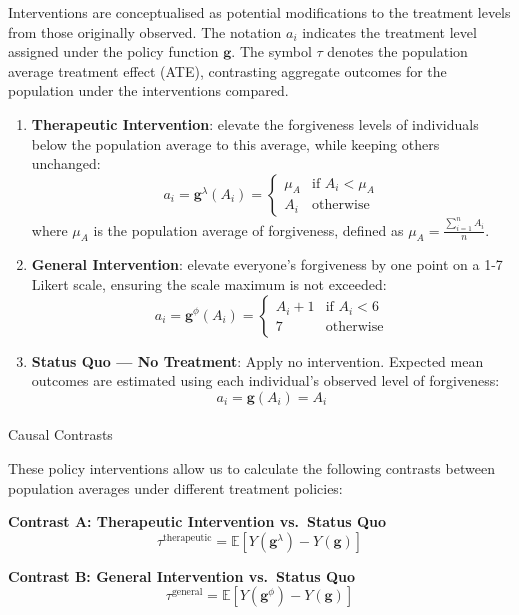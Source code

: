 \documentclass[
  single column]{article}
\makeatletter
\let\oldparagraph\paragraph
\renewcommand{\paragraph}{
    \@ifstar
      \xxxParagraphStar
      \xxxParagraphNoStar
  }
\newcommand{\xxxParagraphStar}[1]{\oldparagraph*{#1}\mbox{}}
\newcommand{\xxxParagraphNoStar}[1]{\oldparagraph{#1}\mbox{}}
\makeatother
\begin{document}
Interventions are conceptualised as potential modifications to the
treatment levels from those originally observed. The notation \(a_i\)
indicates the treatment level assigned under the policy function
\(\mathbf{g}\). The symbol \(\tau\) denotes the population average
treatment effect (ATE), contrasting aggregate outcomes for the
population under the interventions compared.

\begin{enumerate}
\def\labelenumi{\arabic{enumi}.}
\item
  \textbf{Therapeutic Intervention}: elevate the forgiveness levels of
  individuals below the population average to this average, while
  keeping others unchanged: \[
  a_i = \mathbf{g}^\lambda(A_i) = \begin{cases} 
  \mu_A & \text{if } A_i < \mu_A \\ 
  A_i & \text{otherwise} 
  \end{cases}
  \] where \(\mu_A\) is the population average of forgiveness, defined
  as \(\mu_A = \frac{\sum_{i=1}^n A_i}{n}\).
\item
  \textbf{General Intervention}: elevate everyone's forgiveness by one
  point on a 1-7 Likert scale, ensuring the scale maximum is not
  exceeded: \[
  a_i = \mathbf{g}^\phi(A_i) = \begin{cases} 
  A_i + 1 & \text{if } A_i < 6 \\ 
  7 & \text{otherwise} 
  \end{cases}
  \]
\item
  \textbf{Status Quo --- No Treatment}: Apply no intervention. Expected
  mean outcomes are estimated using each individual's observed level of
  forgiveness: \[
  a_i = \mathbf{g}(A_i) = A_i
  \]
\end{enumerate}

\paragraph{Causal Contrasts}\label{causal-contrasts}

These policy interventions allow us to calculate the following contrasts
between population averages under different treatment policies:

\textbf{Contrast A: Therapeutic Intervention vs.~Status Quo} \[
   \tau^{\text{therapeutic}} = \mathbb{E}[Y(\mathbf{g}^\lambda) - Y(\mathbf{g})]
   \]

\textbf{Contrast B: General Intervention vs.~Status Quo} \[
   \tau^{\text{general}} = \mathbb{E}[Y(\mathbf{g}^\phi) - Y(\mathbf{g})]
   \]
\end{document}
